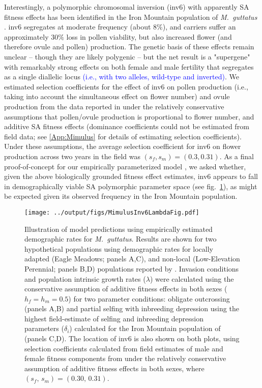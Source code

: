 \documentclass[11pt]{article}
\begin{document}
Interestingly, a polymorphic chromosomal inversion (inv6) with apparently SA fitness effects has been identified in the Iron Mountain population of {\itshape M.~guttatus} \citep{LeeKelly2015}. inv6 segregates at moderate frequency (about $8\%$), and carriers suffer an approximately $30 \%$ loss in pollen viability, but also increased flower (and therefore ovule and pollen) production. The genetic basis of these effects remain unclear -- though they are likely polygenic -- but the net result is a "supergene" with remarkably strong effects on both female and male fertility that segregates as a single diallelic locus \textcolor{blue}{(i.e., with two alleles, wild-type and inverted)}. We estimated selection coefficients for the effect of inv6 on pollen production (i.e., taking into account the simultaneous effect on flower number) and ovule production from the data reported in \citet{LeeKelly2015} under the relatively conservative assumptions that pollen/ovule production is proportional to flower number, and  additive SA fitness effects (dominance coefficients could not be estimated from field data; see \ref{App:Mimulus} for details of estimating selection coefficients). Under these assumptions, the average selection coefficient for inv6 on flower production across two years in the field was $(s_f,s_m) = (0.3,0.31)$. As a final proof-of-concept for our empirically parameterized model \citep[e.g.,][]{Servedio2014}, we asked whether, given the above biologically grounded fitness effect estimates, inv6 appears to fall in demographically viable SA polymorphic parameter space (see fig.~\ref{fig:mimulusFig}), as might be expected given its observed frequency in the Iron Mountain population.



\begin{figure}[htbp]
 \centering
 \texttt{[image: ../output/figs/MimulusInv6LambdaFig.pdf]}
 \caption{\footnotesize{Illustration of model predictions using empirically estimated demographic rates for {\itshape M.~guttatus}. Results are shown for two hypothetical populations using demographic rates for locally adapted (Eagle Meadows; panels A,C), and non-local (Low-Elevation Perennial; panels B,D) populations reported by \citet{PetersonEtAl2016}. Invasion conditions and population intrinsic growth rates ($\lambda$) were calculated using the conservative assumption of additive fitness effects in both sexes ($h_f = h_m = 0.5$) for two parameter conditions: obligate outcrossing (panels A,B) and partial selfing with inbreeding depression using the highest field-estimate of selfing and inbreeding depression parameters ($\delta_i$) calculated for the Iron Mountain population of \citet{Willis1993} (panels C,D). The location of inv6 is also shown on both plots, using selection coefficients calculated from field estimates of male and female fitness components from \citet{LeeKelly2015} under the relatively conservative assumption of additive fitness effects in both sexes, where $(s_f,\,s_m) = (0.30,\, 0.31)$.}} 
 \label{fig:mimulusFig}
 \end{figure}
\end{document}
